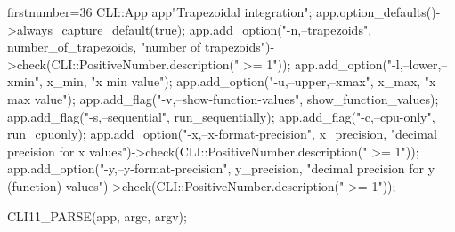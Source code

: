\begin{cppcode*}{firstnumber=36}
    CLI::App app{"Trapezoidal integration"};
    app.option_defaults()->always_capture_default(true);
    app.add_option("-n,--trapezoids", number_of_trapezoids, "number of trapezoids")->check(CLI::PositiveNumber.description(" >= 1"));
    app.add_option("-l,--lower,--xmin", x_min, "x min value");
    app.add_option("-u,--upper,--xmax", x_max, "x max value");
    app.add_flag("-v,--show-function-values", show_function_values);
    app.add_flag("-s,--sequential", run_sequentially);
    app.add_flag("-c,--cpu-only", run_cpuonly);
    app.add_option("-x,--x-format-precision", x_precision, "decimal precision for x values")->check(CLI::PositiveNumber.description(" >= 1"));
    app.add_option("-y,--y-format-precision", y_precision, "decimal precision for y (function) values")->check(CLI::PositiveNumber.description(" >= 1"));

    CLI11_PARSE(app, argc, argv);
\end{cppcode*}
